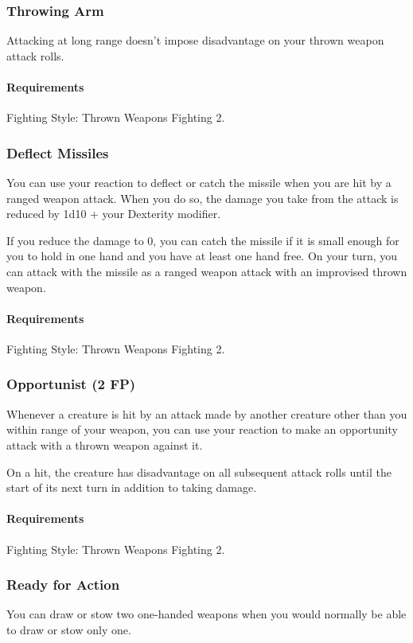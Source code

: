\subsubsection{Throwing Arm} \label{feat::throwingarm}
    Attacking at long range doesn't impose disadvantage on your thrown weapon attack rolls.
    \paragraph{Requirements} Fighting Style: Thrown Weapons Fighting 2.
\subsubsection{Deflect Missiles} \label{feat::deflectmissiles}
    You can use your reaction to deflect or catch the missile when you are hit by a ranged weapon attack.
    When you do so, the damage you take from the attack is reduced by 1d10 + your Dexterity modifier.

    If you reduce the damage to 0, you can catch the missile if it is small enough for you to hold in one hand and you have at least one hand free.
    On your turn, you can attack with the missile as a ranged weapon attack with an improvised thrown weapon.
    \paragraph{Requirements} Fighting Style: Thrown Weapons Fighting 2.
\subsubsection{Opportunist (2 FP)} \label{feat::opportunist}
    Whenever a creature is hit by an attack made by another creature other than you within range of your weapon, you can use your reaction to make an opportunity attack with a thrown weapon against it.

    On a hit, the creature has disadvantage on all subsequent attack rolls until the start of its next turn in addition to taking damage.
    \paragraph{Requirements} Fighting Style: Thrown Weapons Fighting 2.
\subsubsection{Ready for Action} \label{feat::readyforaction}
    You can draw or stow two one-handed weapons when you would normally be able to draw or stow only one.
